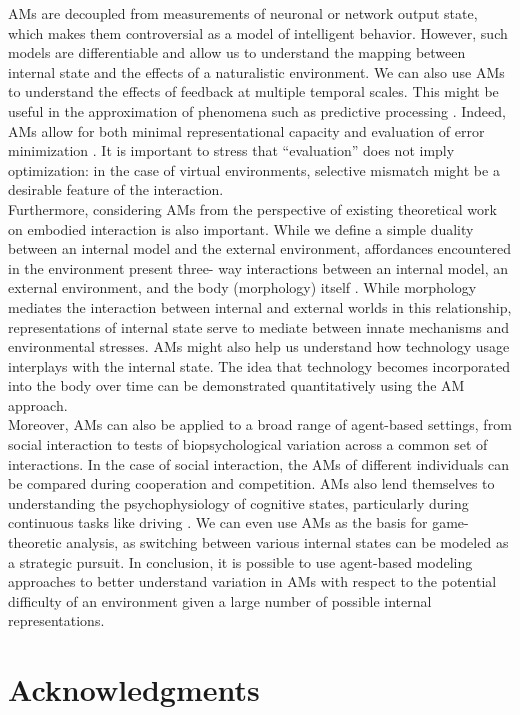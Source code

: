 \documentclass{sigchi}
\begin{document}
AMs are decoupled from measurements of neuronal or network output state, which makes them controversial as a model of intelligent behavior. However, such models are differentiable and allow us to understand the mapping between internal state and the effects of a naturalistic environment. We can also use AMs to understand the effects of feedback at multiple temporal scales. This might be useful in the approximation of phenomena such as predictive processing \cite{nave}. Indeed, AMs allow for both minimal representational capacity and evaluation of error minimization \cite{williams}. It is important to stress that “evaluation” does not imply optimization: in the case of virtual environments, selective mismatch might be a desirable feature of the interaction. 
\\
Furthermore, considering AMs from the perspective of existing theoretical work on embodied interaction is also important. While we define a simple duality between an internal model and the external environment, affordances encountered in the environment present three- way interactions between an internal model, an external environment, and the body (morphology) itself \cite{Dourish:2001:WAI}. While morphology mediates the interaction between internal and external worlds in this relationship, representations of internal state serve to mediate between innate mechanisms and environmental stresses. AMs might also help us understand how technology usage interplays with the internal state. The idea that technology becomes incorporated into the body over time \cite{clark} can be demonstrated quantitatively using the AM approach.\\
Moreover, AMs can also be applied to a broad range of agent-based settings, from social interaction to tests of biopsychological variation across a common set of interactions. In the case of social interaction, the AMs of different individuals can be compared during cooperation and competition. AMs also lend themselves to understanding the psychophysiology of cognitive states, particularly during continuous tasks like driving \cite{lohani}. We can even use AMs as the basis for game-theoretic analysis, as switching between various internal states can be modeled as a strategic pursuit. In conclusion, it is possible to use agent-based modeling approaches to better understand variation in AMs with respect to the potential difficulty of an environment given a large number of possible internal representations.   

\section{Acknowledgments}
\end{document}
